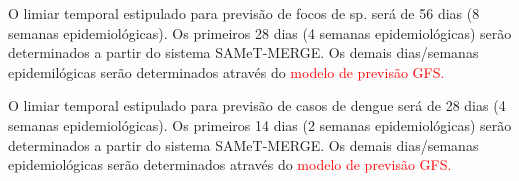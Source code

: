 \documentclass[
	12pt,				%
	openright,			%
	oneside,			%
	a4paper,			%
	english,			%
	french,				%
	spanish,			%
	brazil				%
	dvipsnames, table]{abntex2}
\begin{document}
\indent O limiar temporal estipulado para previsão de focos de  sp. será de 56 dias (8 semanas epidemiológicas). Os primeiros 28 dias (4 semanas epidemiológicas) serão determinados a partir do sistema \acrshort{SAMeT}-\acrshort{MERGE}. Os demais dias/semanas epidemilógicas serão determinados através do \textcolor{red}{modelo de previsão \acrshort{GFS}.}

\indent O limiar temporal estipulado para previsão de casos de dengue será de 28 dias (4 semanas epidemiológicas). Os primeiros 14 dias (2 semanas epidemiológicas) serão determinados a partir do sistema \acrshort{SAMeT}-\acrshort{MERGE}. Os demais dias/semanas epidemiológicas serão determinados através do \textcolor{red}{modelo de previsão \acrshort{GFS}.}


\end{document}
